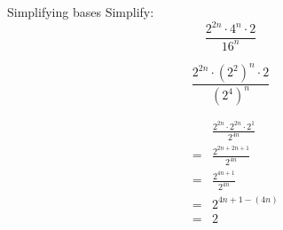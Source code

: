       
\begin{wex}
{
Simplifying bases
}
{
Simplify: $$\frac{2^{2n} \cdot 4^n \cdot 2 }{ 16^n} $$
}
{


$$ \frac{2^{2n} \cdot (2^2)^n \cdot 2 }{ (2^4)^n} $$



\begin{eqnarray*}
 & & \frac{ 2^{2n} \cdot 2^{2n} \cdot 2^1 }{ 2^{4n} } \\
& = & \frac{ 2^{2n + 2n +1}}{2^{4n}} \\
& = & \frac{2^{4n+1}}{2^{4n}} \\
& = & 2^{4n+1-(4n)} \\
& = & 2
\end{eqnarray*}
 


}
\end{wex}


